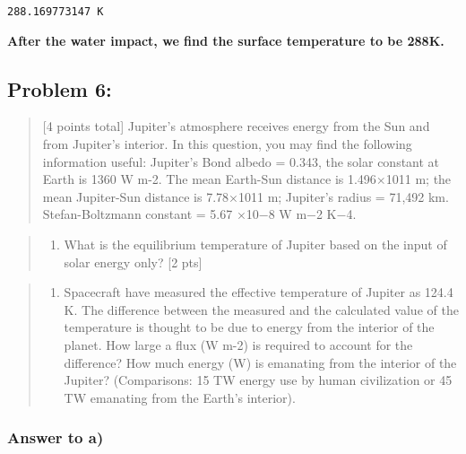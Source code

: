 \documentclass[11pt]{article}
\providecommand{\tightlist}{%
      \setlength{\itemsep}{0pt}\setlength{\parskip}{0pt}}
\begin{document}
    \begin{Verbatim}[commandchars=\\\{\}]
288.169773147 K

    \end{Verbatim}

    \textbf{After the water impact, we find the surface temperature to be
288K.}

    \subsection{Problem 6:}\label{problem-6}

\begin{quote}
{[}4 points total{]} Jupiter's atmosphere receives energy from the Sun
and from Jupiter's interior. In this question, you may find the
following information useful: Jupiter's Bond albedo = 0.343, the solar
constant at Earth is 1360 W m-2. The mean Earth-Sun distance is
1.496×1011 m; the mean Jupiter-Sun distance is 7.78×1011 m; Jupiter's
radius = 71,492 km. Stefan-Boltzmann constant = 5.67 ×10−8 W m−2 K−4.
\end{quote}

\begin{quote}
\begin{enumerate}
\def\labelenumi{(\roman{enumi})}
\tightlist
\item
  What is the equilibrium temperature of Jupiter based on the input of
  solar energy only? {[}2 pts{]}
\end{enumerate}
\end{quote}

\begin{quote}
\begin{enumerate}
\def\labelenumi{(\roman{enumi})}
\setcounter{enumi}{1}
\tightlist
\item
  Spacecraft have measured the effective temperature of Jupiter as 124.4
  K. The difference between the measured and the calculated value of the
  temperature is thought to be due to energy from the interior of the
  planet. How large a flux (W m-2) is required to account for the
  difference? How much energy (W) is emanating from the interior of the
  Jupiter? (Comparisons: 15 TW energy use by human civilization or 45 TW
  emanating from the Earth's interior).
\end{enumerate}
\end{quote}

\subsubsection{Answer to a)}\label{answer-to-a}
\end{document}
